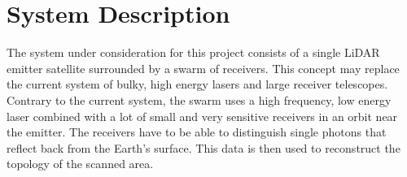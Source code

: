 \section{System Description}
\label{dsePPSystemDescription}
The system under consideration for this project consists of a single LiDAR emitter satellite surrounded by a swarm of receivers. This concept may replace the current system of bulky, high energy lasers and large receiver telescopes. Contrary to the current system, the swarm uses a high frequency, low energy laser combined with a lot of small and very sensitive receivers in an orbit near the emitter. The receivers have to be able to distinguish single photons that reflect back from the Earth's surface. This data is then used to reconstruct the topology of the scanned area.